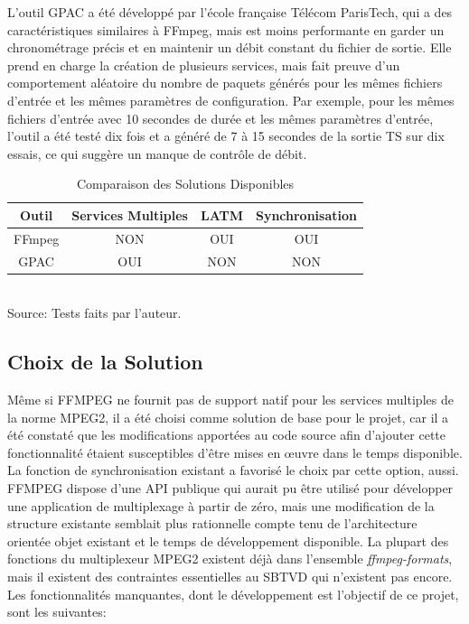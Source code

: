 \documentclass[12pt,a4paper]{article}
\begin{document}
L'outil GPAC a été développé par l'école française Télécom ParisTech, qui a des caractéristiques similaires à FFmpeg, mais est moins performante en garder un chronométrage précis et en maintenir un débit constant du fichier de sortie. Elle prend en charge la création de plusieurs services, mais fait preuve d'un comportement aléatoire du nombre de paquets générés pour les mêmes fichiers d'entrée et les mêmes paramètres de configuration. Par exemple, pour les mêmes fichiers d'entrée avec 10 secondes de durée et les mêmes paramètres d'entrée, l'outil a été testé dix fois et a généré de 7 à 15 secondes de la sortie TS sur dix essais, ce qui suggère un manque de contrôle de débit.

\begin{table}[!htpd]
\caption{Comparaison des Solutions Disponibles}
\begin{center}
\begin{tabular}{|c|c|c|c|}
\hline
Outil & Services Multiples & LATM & Synchronisation\\
\hline
FFmpeg & NON & OUI & OUI\\
\hline
GPAC & OUI & NON & NON\\
\hline
\end{tabular}
\label{tab_comparison_tools}
\\Source: Tests faits par l'auteur.
\end{center}
\end{table}

\subsection{Choix de la Solution}

Même si FFMPEG ne fournit pas de support natif pour les services multiples de la norme MPEG2, il a été choisi comme solution de base pour le projet, car il a été constaté que les modifications apportées au code source afin d'ajouter cette fonctionnalité étaient susceptibles d'être mises en œuvre dans le temps disponible. La fonction de synchronisation existant a favorisé le choix par cette option, aussi. FFMPEG dispose d'une API publique qui aurait pu être utilisé pour développer une application de multiplexage à partir de zéro, mais une modification de la structure existante semblait plus rationnelle compte tenu de l'architecture orientée objet existant et le temps de développement disponible. La plupart des fonctions du multiplexeur MPEG2 existent déjà dans l'ensemble \textit{ffmpeg-formats}, mais il existent des contraintes essentielles au SBTVD qui n'existent pas encore. Les fonctionnalités manquantes, dont le développement est l'objectif de ce projet, sont les suivantes:
\end{document}
